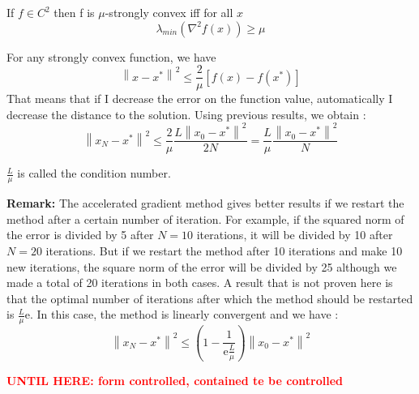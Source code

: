 \begin{proposition}
If $f \in C^2$ then f is $\mu$-strongly convex iff for all $x$ 
\[
    \lambda_{min}(\nabla^2f(x))\ge \mu
\]
\end{proposition}


\begin{lemma}
For any strongly convex function, we have
\begin{equation*}
\left\|x - x^*\right\|^2 \leq \frac{2}{\mu}[f(x) - f(x^*)]
\end{equation*}
That means that if I decrease the error on the function value, automatically I decrease the distance to the solution. Using previous results, we obtain :
\begin{equation*}
\left\|x_N - x^*\right\|^2 \leq \frac{2}{\mu}\frac{L\left\|x_0 - x^*\right\|^2}{2N} = \frac{L}{\mu}\frac{\left\|x_0 - x^*\right\|^2}{N}
\end{equation*}
\end{lemma}

$\frac{L}{\mu}$ is called the condition number.


\textbf{Remark:} The accelerated gradient method gives better results if we restart the method after a certain number of iteration. For example, if the squared norm of the error is divided by 5 after $N = 10$ iterations, it will be divided by 10 after $N = 20$ iterations. But if we restart the method after 10 iterations and make 10 new iterations, the square norm of the error will be divided by 25 although we made a total of 20 iterations in both cases. A result that is not proven here is that the optimal number of iterations after which the method should be restarted is $\frac{L}{\mu}\text{e}$. In this case, the method is linearly convergent and we have :
\[
    \left\|x_N - x^*\right\|^2 \leq \left(1-\frac{1}{\text{e}\frac{L}{\mu}}\right)\left\|x_0 - x^*\right\|^2
\]

\textbf{\textcolor{red}{UNTIL HERE: form controlled, contained te be controlled}}
%
